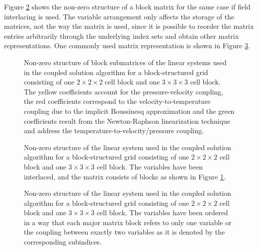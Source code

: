 Figure \ref{fig:interlacemat} shows the non-zero structure of a block matrix for the same case if field interlacing is used. The variable arrangement only affects the storage of the matrices, not the way the matrix is used, since it is possible to reorder the matrix entries arbitrarily through the underlying index sets and obtain other matrix representations. One commonly used matrix representation is shown in Figure \ref{fig:nointerlacemat}.

\begin{figure}
  \centering
  
  \caption{Non-zero structure of block submatrices of the linear systems used in the coupled solution algorithm for a block-structured grid consisting of one $2\times2\times2$ cell block and one $3\times3\times3$ cell block. The yellow coefficients account for the pressure-velocity coupling, the red coefficients correspond to the velocity-to-temperature coupling due to the implicit Boussinesq approximation and the green coefficients result from the Newton-Raphson linearization technique and address the temperature-to-velocity/pressure coupling.}
  \label{fig:cpldassemble}
\end{figure}

\begin{figure}
  \centering
  
  \caption{Non-zero structure of the linear system used in the coupled solution algorithm for a block-structured grid consisting of one $2\times2\times2$ cell block and one $3\times3\times3$ cell block. The variables have been interlaced, and the matrix consists of blocks as shown in Figure \ref{fig:cpldassemble}.}
  \label{fig:interlacemat}
\end{figure}

\begin{figure}
  \centering
   
  \caption{Non-zero structure of the linear system used in the coupled solution algorithm for a block-structured grid consisting of one $2\times2\times2$ cell block and one $3\times3\times3$ cell block. The variables have been ordered in a way that each major matrix block refers to only one variable or the coupling between exactly two variables as it is denoted by the corresponding subindices.}
  \label{fig:nointerlacemat}
\end{figure}
